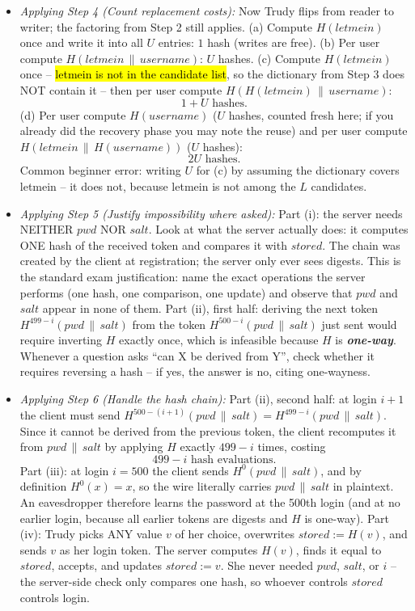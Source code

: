 \documentclass[12pt, a4paper]{article}
\newcommand{\term}[1]{\textbf{\textit{#1}}}        %
\newcommand{\imp}[1]{\hl{#1}}                       %
\begin{document}
\begin{itemize}
    \item \textit{Applying Step 4 (Count replacement costs):} Now Trudy flips from reader to writer; the factoring from Step 2 still applies. (a) Compute $H(letmein)$ once and write it into all $U$ entries: $1$ hash (writes are free). (b) Per user compute $H(letmein \,\|\, username)$: $U$ hashes. (c) Compute $H(letmein)$ once -- \imp{letmein is not in the candidate list}, so the dictionary from Step 3 does NOT contain it -- then per user compute $H(H(letmein) \,\|\, username)$: \[ 1 + U \text{ hashes.} \] (d) Per user compute $H(username)$ ($U$ hashes, counted fresh here; if you already did the recovery phase you may note the reuse) and per user compute $H(letmein \,\|\, H(username))$ ($U$ hashes): \[ 2U \text{ hashes.} \] Common beginner error: writing $U$ for (c) by assuming the dictionary covers letmein -- it does not, because letmein is not among the $L$ candidates.
    \item \textit{Applying Step 5 (Justify impossibility where asked):} Part (i): the server needs NEITHER $pwd$ NOR $salt$. Look at what the server actually does: it computes ONE hash of the received token and compares it with $stored$. The chain was created by the client at registration; the server only ever sees digests. This is the standard exam justification: name the exact operations the server performs (one hash, one comparison, one update) and observe that $pwd$ and $salt$ appear in none of them. Part (ii), first half: deriving the next token $H^{499-i}(pwd \,\|\, salt)$ from the token $H^{500-i}(pwd \,\|\, salt)$ just sent would require inverting $H$ exactly once, which is infeasible because $H$ is \term{one-way}. Whenever a question asks ``can X be derived from Y'', check whether it requires reversing a hash -- if yes, the answer is no, citing one-wayness.
    \item \textit{Applying Step 6 (Handle the hash chain):} Part (ii), second half: at login $i+1$ the client must send $H^{500-(i+1)}(pwd \,\|\, salt) = H^{499-i}(pwd \,\|\, salt)$. Since it cannot be derived from the previous token, the client recomputes it from $pwd \,\|\, salt$ by applying $H$ exactly $499 - i$ times, costing \[ 499 - i \text{ hash evaluations.} \] Part (iii): at login $i = 500$ the client sends $H^{0}(pwd \,\|\, salt)$, and by definition $H^{0}(x) = x$, so the wire literally carries $pwd \,\|\, salt$ in plaintext. An eavesdropper therefore learns the password at the 500th login (and at no earlier login, because all earlier tokens are digests and $H$ is one-way). Part (iv): Trudy picks ANY value $v$ of her choice, overwrites $stored := H(v)$, and sends $v$ as her login token. The server computes $H(v)$, finds it equal to $stored$, accepts, and updates $stored := v$. She never needed $pwd$, $salt$, or $i$ -- the server-side check only compares one hash, so whoever controls $stored$ controls login.

\end{itemize}
\end{document}
